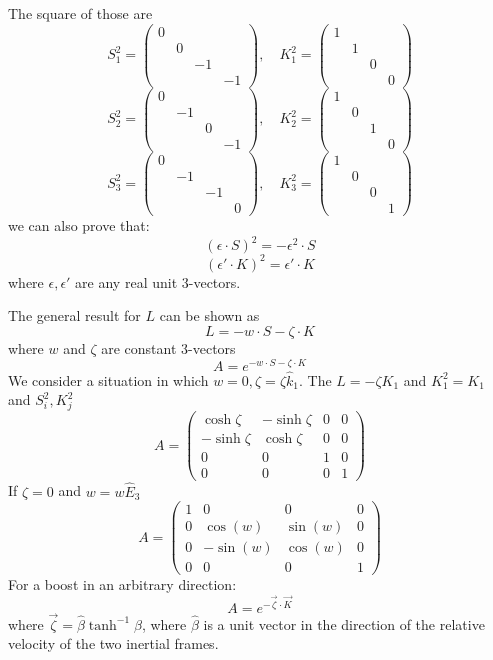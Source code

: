 \documentclass{article}
\begin{document}
	The square of those are
	\[
	S_1^2 = \begin{pmatrix} 0 & & & \\ & 0 & & \\ & & -1 & \\ & & & -1 \end{pmatrix}, \quad
	K_1^2 = \begin{pmatrix} 1 & & & \\ & 1 & & \\ & & 0 & \\ & & & 0 \end{pmatrix}
	\]
	\[
	S_2^2 = \begin{pmatrix} 0 & & & \\ & -1 & & \\ & & 0 & \\ & & & -1 \end{pmatrix}, \quad
	K_2^2 = \begin{pmatrix} 1 & & & \\ & 0 & & \\ & & 1 & \\ & & & 0 \end{pmatrix}
	\]
	\[
	S_3^2 = \begin{pmatrix} 0 & & & \\ & -1 & & \\ & & -1 & \\ & & & 0 \end{pmatrix}, \quad
	K_3^2 = \begin{pmatrix} 1 & & & \\ & 0 & & \\ & & 0 & \\ & & & 1 \end{pmatrix}
	\]
	we can also prove that:
	\[
	(\epsilon \cdot S)^2 = - \epsilon^2 \cdot S
	\]
	\[
	(\epsilon' \cdot K)^2 = \epsilon' \cdot K
	\]
	where $\epsilon, \epsilon'$ are any real unit 3-vectors.
	
	The general result for $L$ can be shown as
	\[
	L = -w \cdot S - \zeta \cdot K
	\]
	where $w$ and $\zeta$ are constant 3-vectors
	\[
	A = e^{-w \cdot S - \zeta \cdot K}
	\]
	We consider a situation in which $w=0, \zeta = \zeta \hat{k}_1$.
	The $L = - \zeta K_1$ and $K_1^2 = K_1$ and $S_i^2, K_j^2$
	\[
	A = \begin{pmatrix} \cosh\zeta & -\sinh\zeta & 0 & 0 \\ -\sinh\zeta & \cosh\zeta & 0 & 0 \\ 0 & 0 & 1 & 0 \\ 0 & 0 & 0 & 1 \end{pmatrix}
	\]
	If $\zeta=0$ and $w = w \hat{E}_3$
	\[
	A = \begin{pmatrix} 1 & 0 & 0 & 0 \\ 0 & \cos(w) & \sin(w) & 0 \\ 0 & -\sin(w) & \cos(w) & 0 \\ 0 & 0 & 0 & 1 \end{pmatrix}
	\]
	For a boost in an arbitrary direction:
	\[
	A = e^{-\vec{\zeta} \cdot \vec{K}}
	\]
	where $\vec{\zeta} = \hat{\beta} \tanh^{-1} \beta$, where $\hat{\beta}$ is a unit vector in the direction of the relative velocity of the two inertial frames.
	
\end{document}

